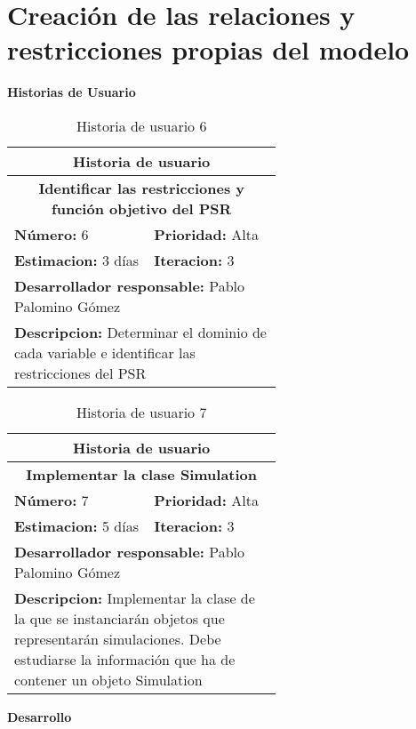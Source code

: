 \section{Creación de las relaciones y restricciones propias del modelo}
\textbf{Historias de Usuario}\\
\begin{table}[H]
        \centering
        \begin{tabular}{|p{0.3\linewidth}|p{0.3\linewidth}|}
          \hline
          \multicolumn{2}{|c|}{Historia de usuario}\\ \hline
          \multicolumn{2}{|c|}{\textbf{Identificar las restricciones y función objetivo del PSR}}\\ \hline
          \textbf{Número:} 6 & \textbf{Prioridad:} Alta\\ \hline
          \textbf{Estimacion:} 3 días & \textbf{Iteracion:} 3\\ \hline
          \multicolumn{2}{|l|}{\textbf{Desarrollador responsable:} Pablo Palomino Gómez}\\ \hline
          \multicolumn{2}{|p{0.6\linewidth}|}{\textbf{Descripcion:} Determinar el dominio de cada variable e identificar las restricciones del PSR}\\ \hline
        \end{tabular}
        \caption{Historia de usuario 6}
        \label{tab:hist6}
\end{table}
\begin{table}[H]
        \centering
        \begin{tabular}{|p{0.3\linewidth}|p{0.3\linewidth}|}
          \hline
          \multicolumn{2}{|c|}{Historia de usuario}\\ \hline
          \multicolumn{2}{|c|}{\textbf{Implementar la clase Simulation }}\\ \hline
          \textbf{Número:} 7 & \textbf{Prioridad:} Alta\\ \hline
          \textbf{Estimacion:} 5 días & \textbf{Iteracion:} 3\\ \hline
          \multicolumn{2}{|l|}{\textbf{Desarrollador responsable:} Pablo Palomino Gómez}\\ \hline
          \multicolumn{2}{|p{0.6\linewidth}|}{\textbf{Descripcion:} Implementar la clase de la que se instanciarán objetos que representarán simulaciones. Debe estudiarse la información que ha de contener un objeto Simulation}\\ \hline
        \end{tabular}
        \caption{Historia de usuario 7}
        \label{tab:hist7}
\end{table}
\textbf{Desarrollo}\\

